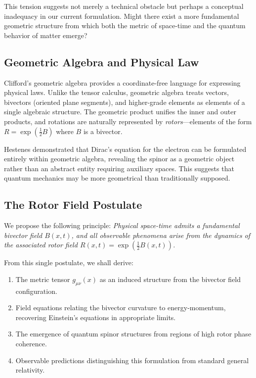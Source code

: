 \documentclass[11pt,a4paper]{article}
\numberwithin{equation}{section}
\theoremstyle{plain}
\theoremstyle{definition}
\theoremstyle{remark}
\begin{document}
This tension suggests not merely a technical obstacle but perhaps a conceptual inadequacy in our current formulation. Might there exist a more fundamental geometric structure from which both the metric of space-time and the quantum behavior of matter emerge?

\subsection{Geometric Algebra and Physical Law}

Clifford's geometric algebra provides a coordinate-free language for expressing physical laws. Unlike the tensor calculus, geometric algebra treats vectors, bivectors (oriented plane segments), and higher-grade elements as elements of a single algebraic structure. The geometric product unifies the inner and outer products, and rotations are naturally represented by \emph{rotors}---elements of the form $R=\exp(\frac{1}{2}B)$ where $B$ is a bivector.

Hestenes demonstrated that Dirac's equation for the electron can be formulated entirely within geometric algebra, revealing the spinor as a geometric object rather than an abstract entity requiring auxiliary spaces. This suggests that quantum mechanics may be more geometrical than traditionally supposed.

\subsection{The Rotor Field Postulate}

We propose the following principle: \emph{Physical space-time admits a fundamental bivector field $B(x,t)$, and all observable phenomena arise from the dynamics of the associated rotor field $R(x,t)=\exp(\frac{1}{2}B(x,t))$.}

From this single postulate, we shall derive:

\begin{enumerate}
  \item The metric tensor $g_{\mu\nu}(x)$ as an induced structure from the bivector field configuration.
  \item Field equations relating the bivector curvature to energy-momentum, recovering Einstein's equations in appropriate limits.
  \item The emergence of quantum spinor structures from regions of high rotor phase coherence.
  \item Observable predictions distinguishing this formulation from standard general relativity.
\end{enumerate}
\end{document}
